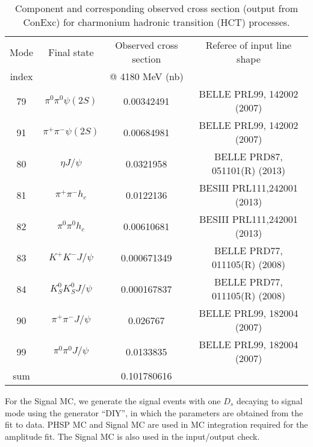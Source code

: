\begin{table}[htp]
\begin{center}
\caption{Component and corresponding observed cross section (output from ConExc) for
charmonium hadronic transition (HCT) processes.}
\begin{tabular}{c|c|c|c} \hline
Mode   & Final state       & Observed cross section & Referee of input line shape    \\
index  &                   & @ 4180 MeV (nb)        &                                \\
\hline 
79 &   $\pi^0 \pi^0 \psi(2S)$  & 0.00342491         & BELLE  PRL99, 142002 (2007)    \\
91 &   $\pi^+ \pi^- \psi(2S)$  & 0.00684981         & BELLE  PRL99, 142002 (2007)    \\
80 &   $\eta J/\psi$           & 0.0321958          & BELLE  PRD87, 051101(R) (2013) \\
81 &   $\pi^+ \pi^- h_c$       & 0.0122136          & BESIII PRL111,242001 (2013)    \\
82 &   $\pi^0 \pi^0 h_c$       & 0.00610681         & BESIII PRL111,242001 (2013)    \\
83 &   $K^+ K^- J/\psi$        & 0.000671349        & BELLE  PRD77, 011105(R) (2008) \\
84 &   $K_S^0 K_S^0 J/\psi$    & 0.000167837        & BELLE  PRD77, 011105(R) (2008) \\
90 &   $\pi^+ \pi^- J/\psi$    & 0.026767           & BELLE  PRL99, 182004 (2007)    \\
99 &   $\pi^0 \pi^0 J/\psi$    & 0.0133835          & BELLE  PRL99, 182004 (2007)    \\
\hline
sum &                          & 0.101780616       &                                 \\
\hline
\end{tabular}
\label{tab:HCT}
\end{center}
\end{table} 


For the Signal MC, we generate the signal events with one $D_{s}$ decaying to signal mode using the generator ``DIY'', in which the parameters are obtained from the fit to data. PHSP MC and Signal MC are used in MC integration required for the amplitude fit. The Signal MC is also used in the input/output check.



